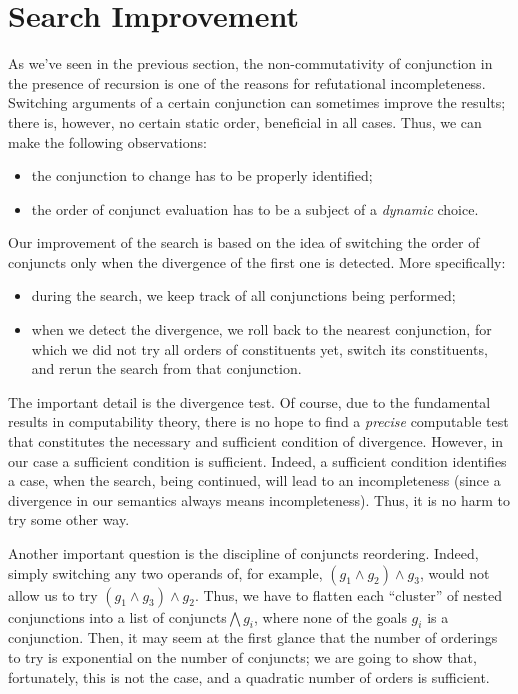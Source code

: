 \section{Search Improvement}
\label{improvement}

As we've seen in the previous section, the non-commutativity of conjunction in the presence of recursion
is one of the reasons for refutational incompleteness. Switching arguments of a certain conjunction
can sometimes improve the results; there is, however, no certain static order, beneficial in all cases.
Thus, we can make the following observations:

\begin{itemize}
\item the conjunction to change has to be properly identified;
\item the order of conjunct evaluation has to be a subject of a \emph{dynamic} choice.
\end{itemize}

Our improvement of the search is based on the idea of switching the order of conjuncts only when
the divergence of the first one is detected. More specifically: 

\begin{itemize}
\item during the search, we keep track of all conjunctions being performed;
\item when we detect the divergence, we roll back to the nearest conjunction, for which 
we did not try all orders of constituents yet, switch its constituents, and rerun 
the search from that conjunction.
\end{itemize}

The important detail is the divergence test. Of course, due to the fundamental results in computability
theory, there is no hope to find a \emph{precise} computable test that constitutes the necessary and 
sufficient condition of divergence. However, in our case a sufficient condition is sufficient. Indeed,  
a sufficient condition identifies a case, when the search, being continued, will lead to an incompleteness 
(since a divergence in our semantics always means incompleteness). Thus, it is no harm to try some other way. 

Another important question is the discipline of conjuncts reordering. Indeed, simply switching any two operands
of, for example, \mbox{$(g_1\wedge g_2)\wedge g_3$}, would not allow us to try \mbox{$(g_1\wedge g_3)\wedge g_2$}.
Thus, we have to flatten each ``cluster'' of nested conjunctions into a list of conjuncts\mbox{$\bigwedge g_i$}, 
where none of the goals $g_i$ is a conjunction. Then, it may seem at the first glance that the number of orderings to try 
is exponential on the number of conjuncts; we are going to show that, fortunately, this is not the case, and
a quadratic number of orders is sufficient.

